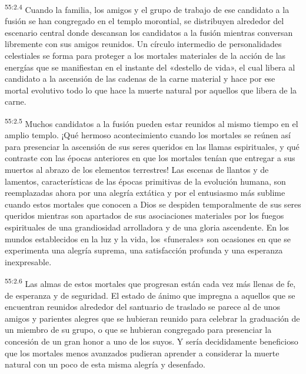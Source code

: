 \par
\textsuperscript{55:2.4} Cuando la familia, los amigos y el grupo de trabajo de ese candidato a la fusión se han congregado en el templo morontial, se distribuyen alrededor del escenario central donde descansan los candidatos a la fusión mientras conversan libremente con sus amigos reunidos. Un círculo intermedio de personalidades celestiales se forma para proteger a los mortales materiales de la acción de las energías que se manifiestan en el instante del «destello de vida», el cual libera al candidato a la ascensión de las cadenas de la carne material y hace por ese mortal evolutivo todo lo que hace la muerte natural por aquellos que libera de la carne.

\par
\textsuperscript{55:2.5} Muchos candidatos a la fusión pueden estar reunidos al mismo tiempo en el amplio templo. ¡Qué hermoso acontecimiento cuando los mortales se reúnen así para presenciar la ascensión de sus seres queridos en las llamas espirituales, y qué contraste con las épocas anteriores en que los mortales tenían que entregar a sus muertos al abrazo de los elementos terrestres! Las escenas de llantos y de lamentos, características de las épocas primitivas de la evolución humana, son reemplazadas ahora por una alegría extática y por el entusiasmo más sublime cuando estos mortales que conocen a Dios se despiden temporalmente de sus seres queridos mientras son apartados de sus asociaciones materiales por los fuegos espirituales de una grandiosidad arrolladora y de una gloria ascendente. En los mundos establecidos en la luz y la vida, los «funerales» son ocasiones en que se experimenta una alegría suprema, una satisfacción profunda y una esperanza inexpresable.

\par
\textsuperscript{55:2.6} Las almas de estos mortales que progresan están cada vez más llenas de fe, de esperanza y de seguridad. El estado de ánimo que impregna a aquellos que se encuentran reunidos alrededor del santuario de traslado se parece al de unos amigos y parientes alegres que se hubieran reunido para celebrar la graduación de un miembro de su grupo, o que se hubieran congregado para presenciar la concesión de un gran honor a uno de los suyos. Y sería decididamente beneficioso que los mortales menos avanzados pudieran aprender a considerar la muerte natural con un poco de esta misma alegría y desenfado.

